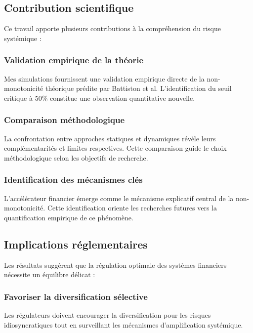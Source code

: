 \documentclass[12pt,a4paper,twoside]{article}
\begin{document}
\subsection{Contribution scientifique}

Ce travail apporte plusieurs contributions à la compréhension du risque systémique :

\subsubsection{Validation empirique de la théorie}

Mes simulations fournissent une validation empirique directe de la non-monotonicité théorique prédite par Battiston et al. L'identification du seuil critique à 50\% constitue une observation quantitative nouvelle.

\subsubsection{Comparaison méthodologique}

La confrontation entre approches statiques et dynamiques révèle leurs complémentarités et limites respectives. Cette comparaison guide le choix méthodologique selon les objectifs de recherche.

\subsubsection{Identification des mécanismes clés}

L'accélérateur financier émerge comme le mécanisme explicatif central de la non-monotonicité. Cette identification oriente les recherches futures vers la quantification empirique de ce phénomène.

\subsection{Implications réglementaires}

Les résultats suggèrent que la régulation optimale des systèmes financiers nécessite un équilibre délicat :

\subsubsection{Favoriser la diversification sélective}

Les régulateurs doivent encourager la diversification pour les risques idiosyncratiques tout en surveillant les mécanismes d'amplification systémique.
\end{document}
